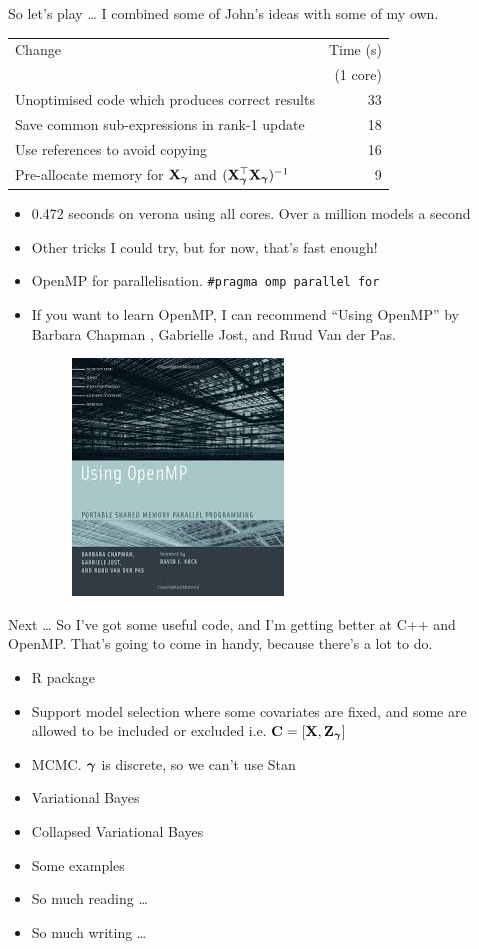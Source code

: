 \documentclass{beamer}
\begin{document}
\begin{frame}{So let's play \ldots}
I combined some of John's ideas with some of my own.
\begin{tabular}{|p{9cm}|r|}
\hline
Change & Time (s) \\
& (1 core) \\
\hline
Unoptimised code which produces correct results & 33 \\
Save common sub-expressions in rank-1 update & 18 \\
Use references to avoid copying & 16 \\
Pre-allocate memory for ${\bf X}_{\boldsymbol \gamma}$ and $({\bf X}_{\boldsymbol \gamma}^\top {\bf X}_{\boldsymbol \gamma})^{-1}$ & 9 \\
\hline
\end{tabular}
\begin{itemize}
\item 0.472 seconds on verona using all cores. Over a million models a second
\item Other tricks I could try, but for now, that's fast enough!
\item OpenMP for parallelisation. \texttt{\#pragma omp parallel for}
\item If you want to learn OpenMP, I can recommend ``Using OpenMP'' by Barbara Chapman ,
		Gabrielle Jost, and Ruud Van der Pas.
\begin{figure}
\includegraphics[scale=0.1]{Using_OpenMP.jpeg}
\end{figure}
\end{itemize}
\end{frame}

\begin{frame}{Next \ldots}
So I've got some useful code, and I'm getting better at C++ and OpenMP. That's going to come in handy, 
because there's a lot to do.
\begin{itemize}
\item R package
\item Support model selection where some covariates are fixed, and some are allowed to be included or excluded
i.e. ${\bf C} = [{\bf X}, {\bf Z}_{\boldsymbol \gamma}]$
\item MCMC. ${\boldsymbol \gamma}$ is discrete, so we can't use Stan
\item Variational Bayes
\item Collapsed Variational Bayes
\item Some examples
\item So much reading \ldots
\item So much writing \ldots
\end{itemize}
\end{frame}
\end{document}
